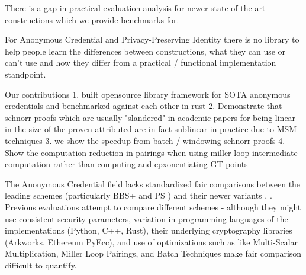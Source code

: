 There is a gap in practical evaluation analysis for newer state-of-the-art constructions which we provide benchmarks for.



For Anonymous Credential and Privacy-Preserving Identity there is no library to help people learn the differences between constructions, what they can use or can't use and how they differ from a practical / functional implementation standpoint. 

Our contributions
1. built opensource library framework for SOTA anonymous credentials and benchmarked against each other in rust
2. Demonstrate that schnorr proofs which are usually "slandered" in academic papers for being linear in the size of the proven attributed are in-fact sublinear in practice due to MSM techniques
3. we show the speedup from batch / windowing schnorr proofs 
4. Show the computation reduction in pairings when using miller loop intermediate computation rather than computing and epxonentiating GT points



The Anonymous Credential field lacks standardized fair comparisons between the leading schemes (particularly BBS+ \cite{hutchison_constant-size_2006} and PS \cite{sako_short_2016}) and their newer variants \cite{camenisch_anonymous_2016}, \cite{tomescu_utt_2022}. Previous evaluations attempt to compare different schemes - although they might use consistent security parameters, variation in programming languages of the implementations (Python, C++, Rust), their underlying cryptography libraries (Arkworks, Ethereum PyEcc), and use of optimizations such as like Multi-Scalar Multiplication, Miller Loop Pairings, and Batch Techniques make fair comparison difficult to quantify. 



